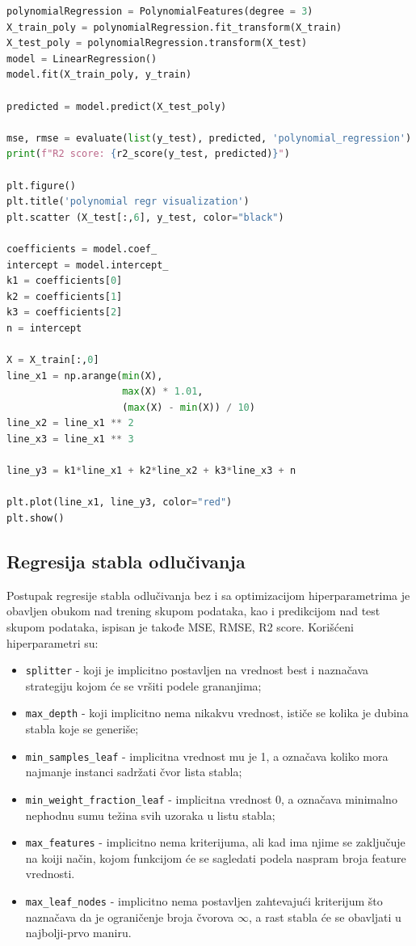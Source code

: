 \documentclass[fontsize=12bp, paper=a4]{scrarticle}
\begin{document}
\begin{lstlisting}[language=Python, caption=Postupak PLR-a]
polynomialRegression = PolynomialFeatures(degree = 3)
X_train_poly = polynomialRegression.fit_transform(X_train)
X_test_poly = polynomialRegression.transform(X_test)
model = LinearRegression()
model.fit(X_train_poly, y_train)

predicted = model.predict(X_test_poly)

mse, rmse = evaluate(list(y_test), predicted, 'polynomial_regression')
print(f"R2 score: {r2_score(y_test, predicted)}")
    
plt.figure()
plt.title('polynomial regr visualization')
plt.scatter (X_test[:,6], y_test, color="black")

coefficients = model.coef_
intercept = model.intercept_
k1 = coefficients[0]
k2 = coefficients[1]
k3 = coefficients[2]
n = intercept

X = X_train[:,0]
line_x1 = np.arange(min(X), 
 					max(X) * 1.01, 
 					(max(X) - min(X)) / 10)
line_x2 = line_x1 ** 2
line_x3 = line_x1 ** 3

line_y3 = k1*line_x1 + k2*line_x2 + k3*line_x3 + n

plt.plot(line_x1, line_y3, color="red")
plt.show()
\end{lstlisting}

\subsection{Regresija stabla odlučivanja}

Postupak regresije stabla odlučivanja\cite{DTR} bez i sa optimizacijom hiperparametrima je obavljen obukom nad trening skupom podataka, kao i predikcijom nad test skupom podataka, ispisan je takođe MSE, RMSE, R2 score. Korišćeni hiperparametri su:
\begin{itemize}
    \item \verb|splitter| - koji je implicitno postavljen na vrednost best i naznačava strategiju kojom će se vršiti podele grananjima;
    \item \verb|max_depth| - koji implicitno nema nikakvu vrednost, ističe se kolika je dubina stabla koje se generiše;
    \item \verb|min_samples_leaf| - implicitna vrednost mu je 1, a označava koliko mora najmanje instanci sadržati čvor lista stabla;
    \item \verb|min_weight_fraction_leaf| - implicitna vrednost 0, a označava minimalno nephodnu sumu težina svih uzoraka u listu stabla; 
    \item \verb|max_features| - implicitno nema kriterijuma, ali kad ima njime se zaključuje na koiji način, kojom funkcijom će se sagledati podela naspram broja feature vrednosti.
    \item \verb|max_leaf_nodes| - implicitno nema postavljen zahtevajući kriterijum što naznačava da je ograničenje broja čvorova $\infty$, a rast stabla će se obavljati u najbolji-prvo maniru.
\end{itemize}
\end{document}
